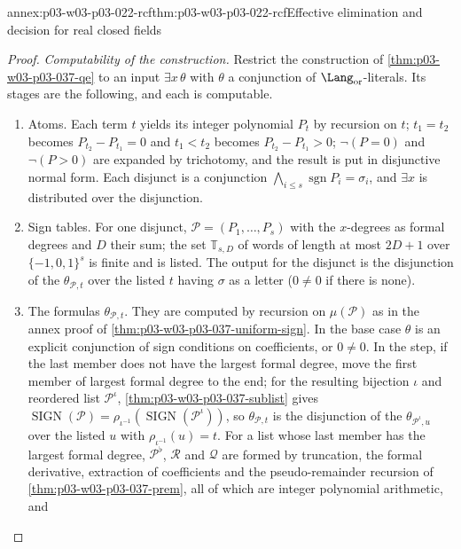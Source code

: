 \begin{annexitem}{annex:p03-w03-p03-022-rcf}{thm:p03-w03-p03-022-rcf}{Effective elimination and decision for real closed fields}
\begin{proof}
\emph{Computability of the construction.} Restrict the construction of
\cref{thm:p03-w03-p03-037-qe} to an input \(\exists x\,\theta\) with
\(\theta\) a conjunction of \(\Lang_{\mathrm{or}}\)-literals. Its stages are
the following, and each is computable.
\begin{enumerate}
\item Atoms. Each term \(t\) yields its integer polynomial \(P_t\) by
  recursion on \(t\); \(t_1=t_2\) becomes \(P_{t_2}-P_{t_1}=0\) and
  \(t_1<t_2\) becomes \(P_{t_2}-P_{t_1}>0\); \(\neg(P=0)\) and
  \(\neg(P>0)\) are expanded by trichotomy, and the result is put in
  disjunctive normal form. Each disjunct is a conjunction
  \(\bigwedge_{i\le s}\operatorname{sgn}P_i=\sigma_i\), and \(\exists x\) is
  distributed over the disjunction.
\item Sign tables. For one disjunct, \(\mathcal P=(P_1,\ldots,P_s)\) with
  the \(x\)-degrees as formal degrees and \(D\) their sum; the set
  \(\mathbb T_{s,D}\) of words of length at most \(2D+1\) over
  \(\{-1,0,1\}^s\) is finite and is listed. The output for the disjunct is
  the disjunction of the \(\theta_{\mathcal P,t}\) over the listed \(t\)
  having \(\sigma\) as a letter (\(0\ne0\) if there is none).
\item The formulas \(\theta_{\mathcal P,t}\). They are computed by
  recursion on \(\mu(\mathcal P)\) as in the annex proof of
  \cref{thm:p03-w03-p03-037-uniform-sign}. In the base case \(\theta\) is an
  explicit conjunction of sign conditions on coefficients, or \(0\ne0\).
  In the step, if the last member does not have the largest formal degree,
  move the first member of largest formal degree to the end; for the
  resulting bijection \(\iota\) and reordered list \(\mathcal P^\iota\),
  \cref{thm:p03-w03-p03-037-sublist} gives
  \(\operatorname{SIGN}(\mathcal P)=\rho_{\iota^{-1}}(\operatorname{SIGN}(\mathcal P^\iota))\),
  so \(\theta_{\mathcal P,t}\) is the disjunction of the
  \(\theta_{\mathcal P^\iota,u}\) over the listed \(u\) with
  \(\rho_{\iota^{-1}}(u)=t\). For a list whose last member has the largest
  formal degree, \(\mathcal P^\flat\), \(\mathcal R\) and \(\mathcal Q\) are
  formed by truncation, the formal derivative, extraction of coefficients
  and the pseudo-remainder recursion of \cref{thm:p03-w03-p03-037-prem},
  all of which are integer polynomial arithmetic, and

\end{enumerate}
\end{proof}
\end{annexitem}
